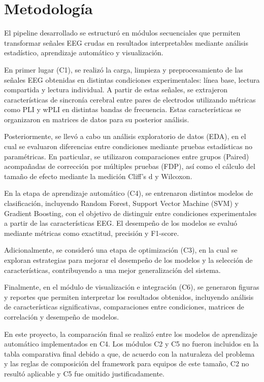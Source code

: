\documentclass[12pt]{article}
\begin{document}
\vspace{0.8cm}

\section{Metodología}

El pipeline desarrollado se estructuró en módulos secuenciales que permiten transformar señales EEG crudas en resultados interpretables mediante análisis estadístico, aprendizaje automático y visualización.

En primer lugar (C1), se realizó la carga, limpieza y preprocesamiento de las señales EEG obtenidas en distintas condiciones experimentales: línea base, lectura compartida y lectura individual. A partir de estas señales, se extrajeron características de sincronía cerebral entre pares de electrodos utilizando métricas como PLI y wPLI en distintas bandas de frecuencia. Estas características se organizaron en matrices de datos para su posterior análisis.

Posteriormente, se llevó a cabo un análisis exploratorio de datos (EDA), en el cual se evaluaron diferencias entre condiciones mediante pruebas estadísticas no paramétricas. En particular, se utilizaron comparaciones entre grupos (Paired) acompañadas de corrección por múltiples pruebas (FDP), así como el cálculo del tamaño de efecto mediante la medición Cliff’s d y Wilcoxon. 

En la etapa de aprendizaje automático (C4), se entrenaron distintos modelos de clasificación, incluyendo Random Forest, Support Vector Machine (SVM) y Gradient Boosting, con el objetivo de distinguir entre condiciones experimentales a partir de las características EEG. El desempeño de los modelos se evaluó mediante métricas como exactitud, precisión y F1-score.

Adicionalmente, se consideró una etapa de optimización (C3), en la cual se exploran estrategias para mejorar el desempeño de los modelos y la selección de características, contribuyendo a una mejor generalización del sistema.

Finalmente, en el módulo de visualización e integración (C6), se generaron figuras y reportes que permiten interpretar los resultados obtenidos, incluyendo análisis de características significativas, comparaciones entre condiciones, matrices de correlación y desempeño de modelos.

En este proyecto, la comparación final se realizó entre los modelos de aprendizaje automático implementados en C4. Los módulos C2 y C5 no fueron incluidos en la tabla comparativa final debido a que, de acuerdo con la naturaleza del problema y las reglas de composición del framework para equipos de este tamaño, C2 no resultó aplicable y C5 fue omitido justificadamente.
\end{document}
